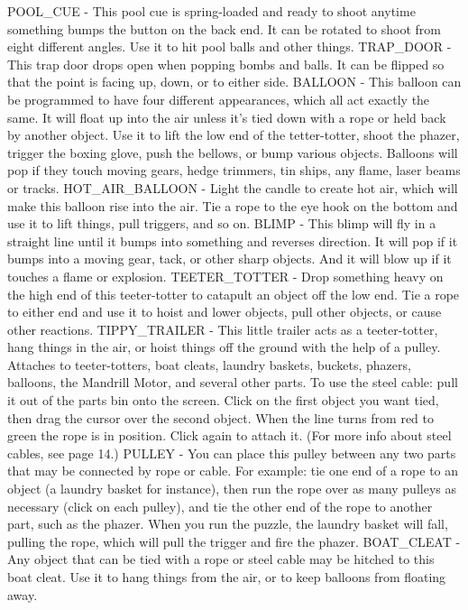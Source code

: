 POOL_CUE - This pool cue is spring-loaded and ready to shoot anytime something bumps the button on the back end. It can be rotated to shoot from eight different angles. Use it to hit pool balls and other things.
TRAP_DOOR - This trap door drops open when popping bombs and balls. It can be flipped so that the point is facing up, down, or to either side.
BALLOON - This balloon can be programmed to have four different appearances, which all act exactly the same. It will float up into the air unless it's tied down with a rope or held back by another object. Use it to lift the low end of the tetter-totter, shoot the phazer, trigger the boxing glove, push the bellows, or bump various objects. Balloons will pop if they touch moving gears, hedge trimmers, tin ships, any flame, laser beams or tracks.
HOT_AIR_BALLOON - Light the candle to create hot air, which will make this balloon rise into the air. Tie a rope to the eye hook on the bottom and use it to lift things, pull triggers, and so on.
BLIMP - This blimp will fly in a straight line until it bumps into something and reverses direction. It will pop if it bumps into a moving gear, tack, or other sharp objects. And it will blow up if it touches a flame or explosion.
TEETER_TOTTER - Drop something heavy on the high end of this teeter-totter to catapult an object off the low end. Tie a rope to either end and use it to hoist and lower objects, pull other objects, or cause other reactions.
TIPPY_TRAILER - This little trailer acts as a teeter-totter, hang things in the air, or hoist things off the ground with the help of a pulley. Attaches to teeter-totters, boat cleats, laundry baskets, buckets, phazers, balloons, the Mandrill Motor, and several other parts. To use the steel cable: pull it out of the parts bin onto the screen. Click on the first object you want tied, then drag the cursor over the second object. When the line turns from red to green the rope is in position. Click again to attach it. (For more info about steel cables, see page 14.)
PULLEY - You can place this pulley between any two parts that may be connected by rope or cable. For example: tie one end of a rope to an object (a laundry basket for instance), then run the rope over as many pulleys as necessary (click on each pulley), and tie the other end of the rope to another part, such as the phazer. When you run the puzzle, the laundry basket will fall, pulling the rope, which will pull the trigger and fire the phazer.
BOAT_CLEAT - Any object that can be tied with a rope or steel cable may be hitched to this boat cleat. Use it to hang things from the air, or to keep balloons from floating away.
